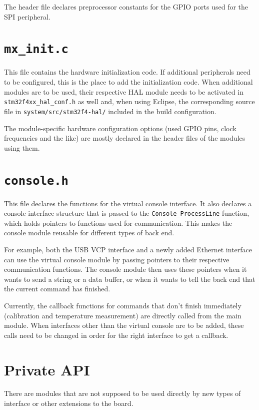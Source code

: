 The header file declares preprocessor constants for the GPIO ports used for the SPI peripheral.


\section{\texttt{mx\_init.c}}

This file contains the hardware initialization code. If additional peripherals need to be configured, this is the
place to add the initialization code. When additional modules are to be used, their respective HAL module needs
to be activated in \verb!stm32f4xx_hal_conf.h! as well and, when using Eclipse, the corresponding source file in
\verb!system/src/stm32f4-hal/! included in the build configuration.

The module-specific hardware configuration options (used GPIO pins, clock frequencies and the like) are mostly declared
in the header files of the modules using them.


\section{\texttt{console.h}}

This file declares the functions for the virtual console interface. It also declares a console interface structure
that is passed to the \verb!Console_ProcessLine! function, which holds pointers to functions used for communication.
This makes the console module reusable for different types of back end.

For example, both the USB VCP interface and a newly added Ethernet interface can use the virtual console module by
passing pointers to their respective communication functions. The console module then uses these pointers when it wants
to send a string or a data buffer, or when it wants to tell the back end that the current command has finished.

Currently, the callback functions for commands that don't finish immediately (calibration and temperature measurement)
are directly called from the main module. When interfaces other than the virtual console are to be added, these
calls need to be changed in order for the right interface to get a callback.


\section{Private API}

There are modules that are not supposed to be used directly by new types of interface or other extensions to the board.

